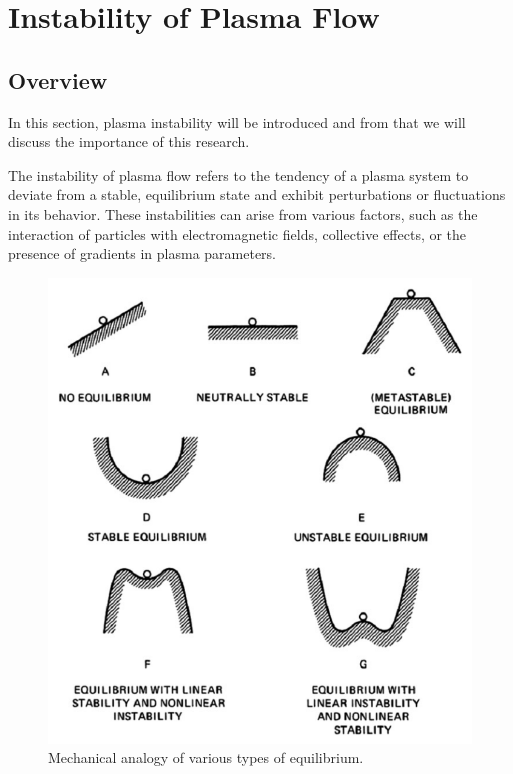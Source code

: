 \section{Instability of Plasma Flow}
\subsection{Overview}
In this section, plasma instability will be introduced and from that we will discuss the importance of this research.

The instability of plasma flow refers to the tendency of a plasma system to deviate from a stable, equilibrium state and exhibit perturbations or fluctuations in its behavior. These instabilities can arise from various factors, such as the interaction of particles with electromagnetic fields, collective effects, or the presence of gradients in plasma parameters.

\begin{figure}[htbp]
	\centering
	\includegraphics[width=0.7\linewidth]{img/introduction/stability-visualization}
	\caption{Mechanical analogy of various types of equilibrium. \cite{chen_introduction_2016}}
	\label{fig:stability-visualization}
\end{figure}

